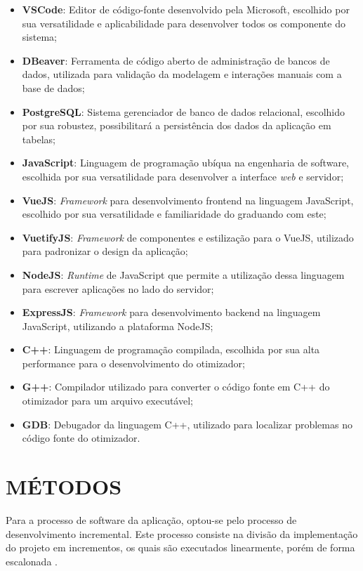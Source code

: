 \begin{itemize}
	\item \textbf{VSCode}: Editor de código-fonte desenvolvido pela Microsoft, escolhido por sua versatilidade e aplicabilidade para desenvolver todos os componente do sistema;
	\item \textbf{DBeaver}: Ferramenta de código aberto de administração de bancos de dados, utilizada para validação da modelagem e interações manuais com a base de dados;
	\item \textbf{PostgreSQL}: Sistema gerenciador de banco de dados relacional, escolhido por sua robustez, possibilitará a persistência dos dados da aplicação em tabelas;
	\item \textbf{JavaScript}: Linguagem de programação ubíqua na engenharia de software, escolhida por sua versatilidade para desenvolver a interface \textit{web} e servidor;
	\item \textbf{VueJS}: \textit{Framework} para desenvolvimento frontend na linguagem JavaScript, escolhido por sua versatilidade e familiaridade do graduando com este;
	\item \textbf{VuetifyJS}: \textit{Framework} de componentes e estilização para o VueJS, utilizado para padronizar o design da aplicação;
	\item \textbf{NodeJS}: \textit{Runtime} de JavaScript que permite a utilização dessa linguagem para escrever aplicações no lado do servidor;
	\item \textbf{ExpressJS}: \textit{Framework} para desenvolvimento backend na linguagem JavaScript, utilizando a plataforma NodeJS;
	\item \textbf{C++}: Linguagem de programação compilada, escolhida por sua alta performance para o desenvolvimento do otimizador;
	\item \textbf{G++}: Compilador utilizado para converter o código fonte em C++ do otimizador para um arquivo executável;
	\item \textbf{GDB}: Debugador da linguagem C++, utilizado para localizar problemas no código fonte do otimizador.
\end{itemize}

\section{MÉTODOS}
\label{sec:metodos}

Para a processo de software da aplicação, optou-se pelo processo de desenvolvimento incremental. Este processo consiste na divisão da implementação do projeto em incrementos, os quais são executados linearmente, porém de forma escalonada \cite{pressman2016}.

